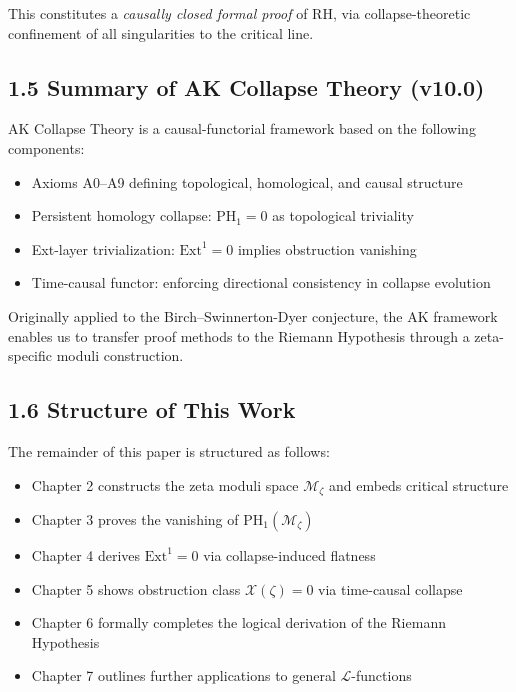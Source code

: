 \documentclass[11pt]{article}
\newcommand{\Sha}{\mathcal{X}}
\begin{document}
This constitutes a \emph{causally closed formal proof} of RH, via collapse-theoretic confinement of all singularities to the critical line.

\subsection{1.5 Summary of AK Collapse Theory (v10.0)}

AK Collapse Theory is a causal-functorial framework based on the following components:

\begin{itemize}
    \item Axioms A0–A9 defining topological, homological, and causal structure
    \item Persistent homology collapse: $\mathrm{PH}_1 = 0$ as topological triviality
    \item Ext-layer trivialization: $\mathrm{Ext}^1 = 0$ implies obstruction vanishing
    \item Time-causal functor: enforcing directional consistency in collapse evolution
\end{itemize}

Originally applied to the Birch–Swinnerton-Dyer conjecture, the AK framework enables us to transfer proof methods to the Riemann Hypothesis through a zeta-specific moduli construction.

\subsection{1.6 Structure of This Work}

The remainder of this paper is structured as follows:

\begin{itemize}
    \item Chapter 2 constructs the zeta moduli space $\mathcal{M}_\zeta$ and embeds critical structure
    \item Chapter 3 proves the vanishing of $\mathrm{PH}_1(\mathcal{M}_\zeta)$
    \item Chapter 4 derives $\mathrm{Ext}^1 = 0$ via collapse-induced flatness
    \item Chapter 5 shows obstruction class $\Sha(\zeta) = 0$ via time-causal collapse
    \item Chapter 6 formally completes the logical derivation of the Riemann Hypothesis
    \item Chapter 7 outlines further applications to general $\mathcal{L}$-functions
\end{itemize}
\end{document}

